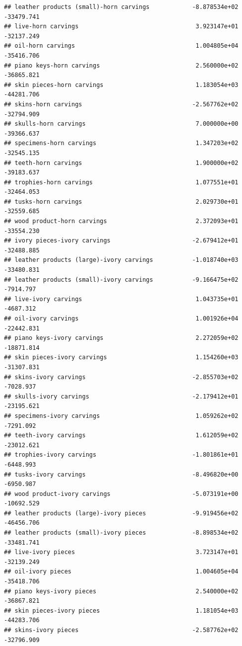 \documentclass[
  12pt,
]{article}
\begin{document}
\begin{verbatim}
## leather products (small)-horn carvings            -8.878534e+02  -33479.741
## live-horn carvings                                 3.923147e+01  -32137.249
## oil-horn carvings                                  1.004805e+04  -35416.706
## piano keys-horn carvings                           2.560000e+02  -36865.821
## skin pieces-horn carvings                          1.183054e+03  -44281.706
## skins-horn carvings                               -2.567762e+02  -32794.909
## skulls-horn carvings                               7.000000e+00  -39366.637
## specimens-horn carvings                            1.347203e+02  -32545.135
## teeth-horn carvings                                1.900000e+02  -39183.637
## trophies-horn carvings                             1.077551e+01  -32464.053
## tusks-horn carvings                                2.029730e+01  -32559.685
## wood product-horn carvings                         2.372093e+01  -33554.230
## ivory pieces-ivory carvings                       -2.679412e+01  -32488.885
## leather products (large)-ivory carvings           -1.018740e+03  -33480.831
## leather products (small)-ivory carvings           -9.166475e+02   -7914.797
## live-ivory carvings                                1.043735e+01   -4687.312
## oil-ivory carvings                                 1.001926e+04  -22442.831
## piano keys-ivory carvings                          2.272059e+02  -18871.814
## skin pieces-ivory carvings                         1.154260e+03  -31307.831
## skins-ivory carvings                              -2.855703e+02   -7028.937
## skulls-ivory carvings                             -2.179412e+01  -23195.621
## specimens-ivory carvings                           1.059262e+02   -7291.092
## teeth-ivory carvings                               1.612059e+02  -23012.621
## trophies-ivory carvings                           -1.801861e+01   -6448.993
## tusks-ivory carvings                              -8.496820e+00   -6950.987
## wood product-ivory carvings                       -5.073191e+00  -10692.529
## leather products (large)-ivory pieces             -9.919456e+02  -46456.706
## leather products (small)-ivory pieces             -8.898534e+02  -33481.741
## live-ivory pieces                                  3.723147e+01  -32139.249
## oil-ivory pieces                                   1.004605e+04  -35418.706
## piano keys-ivory pieces                            2.540000e+02  -36867.821
## skin pieces-ivory pieces                           1.181054e+03  -44283.706
## skins-ivory pieces                                -2.587762e+02  -32796.909

\end{verbatim}
\end{document}
